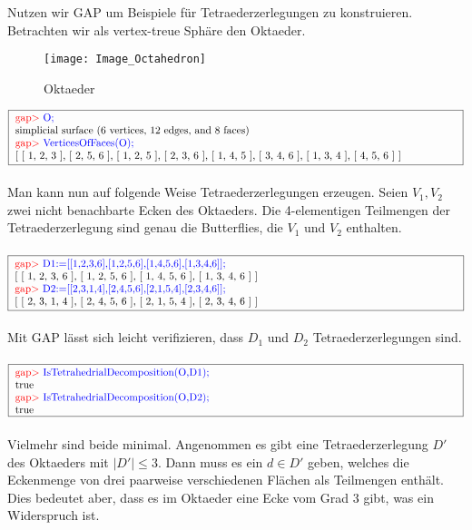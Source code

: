 \documentclass[12pt,titlepage,twoside,cleardoublepage]{article}
\theoremstyle{nummermitklammern}
\numberwithin{equation}{section}
\begin{document}
Nutzen wir GAP um Beispiele für Tetraederzerlegungen zu konstruieren. Betrachten wir als vertex-treue Sphäre den Oktaeder.
\begin{figure}[H]
\begin{center}
\texttt{[image: Image\_Octahedron]}
\end{center}
\caption{Oktaeder}
\end{figure}
$\fbox{
\parbox{15cm}{
\textcolor{red}{gap$>$} \textcolor{blue}{O;}\newline 
simplicial surface (6 vertices, 12 edges, and 8 faces) \newline
\textcolor{red}{gap$>$} \textcolor{blue}{VerticesOfFaces(O);}\newline
[ [ 1, 2, 3 ], [ 2, 5, 6 ], [ 1, 2, 5 ], [ 2, 3, 6 ], [ 1, 4, 5 ],  [ 3, 4, 6 ], [ 1, 3, 4 ], [ 4, 5, 6 ] ]
}}$\\\\
Man kann nun auf folgende Weise Tetraederzerlegungen erzeugen.
Seien $V_1,V_2$ zwei nicht benachbarte Ecken des Oktaeders.
Die 4-elementigen Teilmengen der Tetraederzerlegung sind genau die Butterflies, die $V_1$ und $V_2$ enthalten.\\\\
$\fbox{
\parbox{15cm}{
\textcolor{red}{gap$>$}  \textcolor{blue}{D1:=[[1,2,3,6],[1,2,5,6],[1,4,5,6],[1,3,4,6]];}\newline
[ [ 1, 2, 3, 6 ], [ 1, 2, 5, 6 ], [ 1, 4, 5, 6 ], [ 1, 3, 4, 6 ] ]\newline
\textcolor{red}{gap$>$}  \textcolor{blue}{D2:=[[2,3,1,4],[2,4,5,6],[2,1,5,4],[2,3,4,6]];}\newline
[ [ 2, 3, 1, 4 ], [ 2, 4, 5, 6 ], [ 2, 1, 5, 4 ], [ 2, 3, 4, 6 ] ]
}}$\\\\
Mit GAP lässt sich leicht verifizieren, dass $D_1$ und $D_2$  Tetraederzerlegungen sind.\\\\
$\fbox{
\parbox{15cm}{
\textcolor{red}{gap$>$}  \textcolor{blue}{IsTetrahedrialDecomposition(O,D1);}\newline
 true \newline
\textcolor{red}{gap$>$}  \textcolor{blue}{IsTetrahedrialDecomposition(O,D2);}\newline
 true
 }}$ \\\\
Vielmehr sind beide minimal. Angenommen es gibt eine Tetraederzerlegung $D'$ des Oktaeders mit $\vert D' \vert\leq 3$. Dann muss es ein $d\in D'$ geben, welches die Eckenmenge von drei paarweise verschiedenen Flächen als Teilmengen enthält. Dies bedeutet aber, dass es im Oktaeder eine Ecke vom Grad 3 gibt, was ein Widerspruch ist. 
\end{document}
